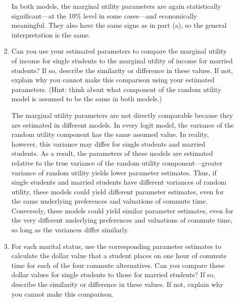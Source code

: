 \documentclass[11pt,letterpaper]{article}\usepackage[]{graphicx}\usepackage[]{color}
\begin{document}
\begin{enumerate}[label=\alph*., leftmargin=*]
\begin{enumerate}[label=\roman*.]
		In both models, the marginal utility parameters are again statistically significant---at the 10\% level in some cases---and economically meaningful. They also have the same signs as in part (a), so the general interpretation is the same.
		
		\item Can you use your estimated parameters to compare the marginal utility of income for single students to the marginal utility of income for married students? If so, describe the similarity or difference in these values. If not, explain why you cannot make this comparison using your estimated parameters. (Hint: think about what component of the random utility model is assumed to be the same in both models.)
		
		The marginal utility parameters are not directly comparable because they are estimated in different models. In every logit model, the variance of the random utility component has the same assumed value. In reality, however, this variance may differ for single students and married students. As a result, the parameters of these models are estimated relative to the true variance of the random utility component---greater variance of random utility yields lower parameter estimates. Thus, if single students and married students have different variances of random utility, these models could yield different parameter estimates, even for the same underlying preferences and valuations of commute time. Conversely, these models could yield similar parameter estimates, even for the very different underlying preferences and valuations of commute time, so long as the variances differ similarly.

		\item For each marital status, use the corresponding parameter estimates to calculate the dollar value that a student places on one hour of commute time for each of the four commute alternatives. Can you compare these dollar values for single students to those for married students? If so, describe the similarity or difference in these values. If not, explain why you cannot make this comparison.


\end{enumerate}
\end{enumerate}
\end{document}
